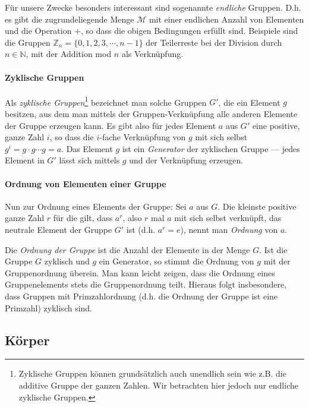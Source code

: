 \begin{refsegment}
Für unsere Zwecke besonders interessant sind sogenannte {\em endliche} Gruppen.
D.h. es gibt die zugrundeliegende Menge $\mathcal{M}$ mit einer endlichen Anzahl von
Elementen und die Operation $+$, so dass die obigen Bedingungen erfüllt sind.
Beispiele sind die Gruppen ${\mathbb Z}_n = \{0, 1, 2, 3, \cdots, n-1\}$ der Teilerreste
bei der Division durch $n \in {\mathbb N}$, mit der Addition mod $n$ als Verknüpfung.

\paragraph*{Zyklische Gruppen}
Als {\it zyklische Gruppen}\footnote{Zyklische Gruppen können grundsätzlich auch unendlich sein wie z.B. die additive Gruppe der ganzen Zahlen. Wir betrachten hier jedoch nur endliche zyklische Gruppen.} bezeichnet man solche Gruppen $G'$, die ein Element $g$ besitzen, aus dem man
mittels der Gruppen-Verknüpfung alle anderen Elemente der Gruppe erzeugen kann. Es gibt also für jedes
Element $a$ aus $G'$ eine positive, ganze Zahl $i$, so dass die $i$-fache Verknüpfung von $g$ mit sich
selbst $g^i = g\cdot g \cdots g = a$. Das Element $g$ ist ein {\em Generator} der zyklischen Gruppe --- jedes Element
in $G'$ lässt sich mittels $g$ und der Verknüpfung erzeugen.


\paragraph*{Ordnung von Elementen einer Gruppe}
Nun zur Ordnung eines Elements der Gruppe: Sei $a$ aus $G$. Die kleinste positive ganze Zahl $r$ für
die gilt, dass $a^r$, also $r$ mal $a$ mit sich selbst verknüpft, das neutrale Element der Gruppe $G'$ ist
(d.h. $a^r = e$), nennt man {\em Ordnung} von $a$.

Die {\it Ordnung der Gruppe} ist die Anzahl der Elemente in der Menge $G$. Ist die Gruppe $G$ zyklisch und $g$ ein Generator, so stimmt die Ordnung von $g$ mit der Gruppenordnung überein. Man kann leicht zeigen, dass die Ordnung eines Gruppenelements stets die Gruppenordnung teilt. Hieraus folgt insbesondere, dass Gruppen mit Primzahlordnung (d.h. die Ordnung der Gruppe ist eine Primzahl) zyklisch sind.


\subsection{Körper}


\end{refsegment}
